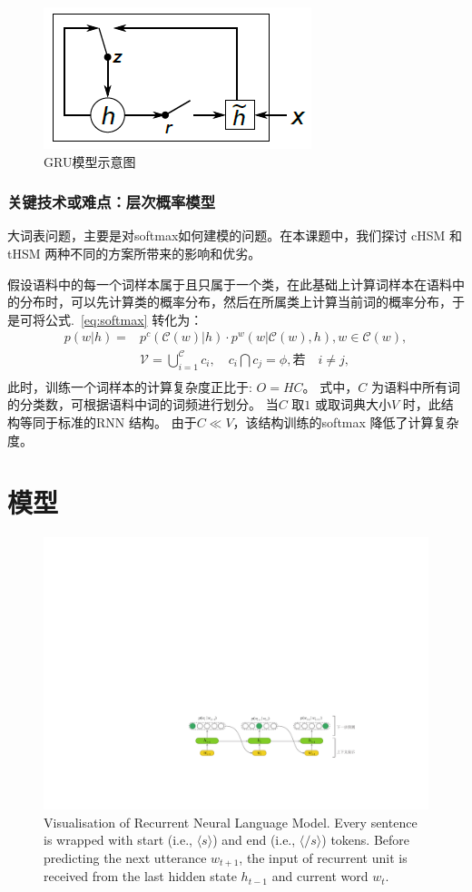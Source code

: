 \documentclass[master,openright,twoside,color]{buaathesis}
\begin{document}
\begin{figure}
  \centering
  \includegraphics[width=0.45\linewidth]{./figures/gru.png}
  \caption{GRU模型示意图}\label{fig:gru}
\end{figure}


\subsection{关键技术或难点：层次概率模型}
大词表问题，主要是对softmax如何建模的问题。在本课题中，我们探讨 cHSM 和 tHSM 两种不同的方案所带来的影响和优劣。

假设语料中的每一个词样本属于且只属于一个类，在此基础上计算词样本在语料中的分布时，可以先计算类的概率分布，然后在所属类上计算当前词的概率分布，于是可将公式.~\ref{eq:softmax} 转化为：
  \begin{equation}
  \begin{split}
p(w|h)=&p^c(\mathcal{C}(w)|h)\cdot p^w(w|\mathcal{C}(w),h) , w\in \mathcal{C}(w),\\
&\mathcal{V}=\bigcup _{i = 1}^\mathcal{C}{c_i},\quad  c_i \bigcap c_j=\phi, \text{若}\quad i\ne j, \\
\end{split}
\end{equation}
此时，训练一个词样本的计算复杂度正比于: $O =HC$。 式中，$C$ 为语料中所有词的分类数，可根据语料中词的词频进行划分。 当$C$ 取$1$ 或取词典大小$V$ 时，此结构等同于标准的RNN 结构。 由于$C \ll V$，该结构训练的softmax 降低了计算复杂度。


\chapter{模型}

\begin{figure}[t]
  \centering
  \includegraphics[width=0.7\columnwidth]{./figures/lm.pdf}
  \caption{Visualisation of Recurrent Neural Language Model. Every sentence is wrapped with start (i.e., $\langle s\rangle$) and end (i.e., $\langle /s\rangle$) tokens. Before predicting the next utterance $w_{t+1}$, the input of recurrent unit is received from the last hidden state $h_{t-1}$ and current word $w_t$.}
  \label{fig:lm}
\end{figure}
\end{document}
